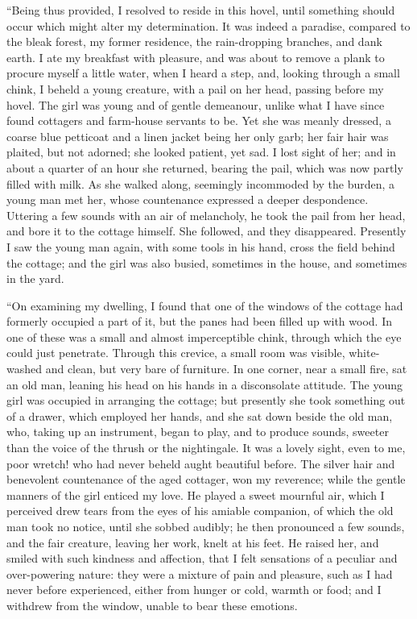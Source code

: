 ``Being thus provided, I resolved to
reside in this hovel, until something
should occur which might alter my determination.
It was indeed a paradise,
compared to the bleak forest, my former
residence, the rain-dropping branches,
and dank earth. I ate my breakfast
with pleasure, and was about to remove
a plank to procure myself a little water,
when I heard a step, and, looking
through a small chink, I beheld a young
creature, with a pail on her head, passing
before my hovel. The girl was
young and of gentle demeanour, unlike
what I have since found cottagers and
farm-house servants to be. Yet she
was meanly dressed, a coarse blue petticoat
and a linen jacket being her
only garb; her fair hair was plaited,
but not adorned; she looked patient,
yet sad. I lost sight of her; and in
about a quarter of an hour she returned,
bearing the pail, which was now
partly filled with milk. As she walked
along, seemingly incommoded by the
burden, a young man met her, whose
countenance expressed a deeper despondence.
Uttering a few sounds with
an air of melancholy, he took the pail
from her head, and bore it to the cottage
himself. She followed, and they
disappeared. Presently I saw the young
man again, with some tools in his hand,
cross the field behind the cottage; and
the girl was also busied, sometimes in
the house, and sometimes in the yard.

``On examining my dwelling, I found
that one of the windows of the cottage
had formerly occupied a part of it,
but the panes had been filled up with
wood. In one of these was a small and
almost imperceptible chink, through
which the eye could just penetrate.
Through this crevice, a small room
was visible, white-washed and clean,
but very bare of furniture. In one
corner, near a small fire, sat an old
man, leaning his head on his hands in a
disconsolate attitude. The young girl
was occupied in arranging the cottage;
but presently she took something out
of a drawer, which employed her hands,
and she sat down beside the old man,
who, taking up an instrument, began
to play, and to produce sounds, sweeter
than the voice of the thrush or the nightingale.
It was a lovely sight, even to
me, poor wretch! who had never beheld
aught beautiful before. The silver
hair and benevolent countenance of
the aged cottager, won my reverence;
while the gentle manners of the girl
enticed my love. He played a sweet
mournful air, which I perceived drew
tears from the eyes of his amiable companion,
of which the old man took no
notice, until she sobbed audibly; he
then pronounced a few sounds, and the
fair creature, leaving her work, knelt
at his feet. He raised her, and smiled
with such kindness and affection, that
I felt sensations of a peculiar and over-powering
nature: they were a mixture
of pain and pleasure, such as I had
never before experienced, either from
hunger or cold, warmth or food; and I
withdrew from the window, unable to
bear these emotions.

